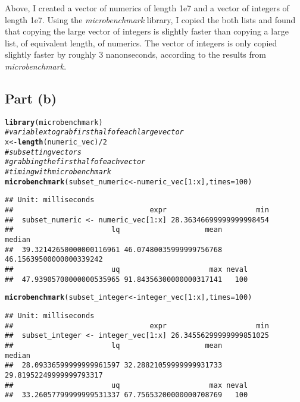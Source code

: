 \documentclass{article}\usepackage[]{graphicx}\usepackage[]{color}
\makeatletter
\newcommand{\hlnum}[1]{\textcolor[rgb]{0.686,0.059,0.569}{#1}}%
\newcommand{\hlcom}[1]{\textcolor[rgb]{0.678,0.584,0.686}{\textit{#1}}}%
\newcommand{\hlopt}[1]{\textcolor[rgb]{0,0,0}{#1}}%
\newcommand{\hlstd}[1]{\textcolor[rgb]{0.345,0.345,0.345}{#1}}%
\newcommand{\hlkwb}[1]{\textcolor[rgb]{0.69,0.353,0.396}{#1}}%
\newcommand{\hlkwc}[1]{\textcolor[rgb]{0.333,0.667,0.333}{#1}}%
\newcommand{\hlkwd}[1]{\textcolor[rgb]{0.737,0.353,0.396}{\textbf{#1}}}%
\newenvironment{kframe}{%
 \def\at@end@of@kframe{}%
 \ifinner\ifhmode%
  \def\at@end@of@kframe{\end{minipage}}%
  \begin{minipage}{\columnwidth}%
 \fi\fi%
 \def\FrameCommand##1{\hskip\@totalleftmargin \hskip-\fboxsep
 \colorbox{shadecolor}{##1}\hskip-\fboxsep
     \hskip-\linewidth \hskip-\@totalleftmargin \hskip\columnwidth}%
 \MakeFramed {\advance\hsize-\width
   \@totalleftmargin\z@ \linewidth\hsize
   \@setminipage}}%
 {\par\unskip\endMakeFramed%
 \at@end@of@kframe}
\newenvironment{knitrout}{}{} %
\makeatother
\begin{document}
Above, I created a vector of numerics of length 1e7 and a vector of integers of length 1e7.  Using the \emph{microbenchmark} library, I copied the both lists and found that copying the large vector of integers is slightly faster than copying a large list, of equivalent length, of numerics.  The vector of integers is only copied slightly faster by roughly 3 nanonseconds, according to the results from \emph{microbenchmark}.
\subsection{Part (b)}
\begin{knitrout}
\color{fgcolor}\begin{kframe}
\begin{alltt}
\hlkwd{library}\hlstd{(microbenchmark)}
\hlcom{#variable x to grab first half of each large vector}
\hlstd{x} \hlkwb{<-} \hlkwd{length}\hlstd{(numeric_vec)}\hlopt{/}\hlnum{2}
\hlcom{#subsetting vectors}
\hlcom{#grabbing the first half of each vector}
\hlcom{#timing with microbenchmark}
\hlkwd{microbenchmark}\hlstd{(subset_numeric} \hlkwb{<-} \hlstd{numeric_vec[}\hlnum{1}\hlopt{:}\hlstd{x],} \hlkwc{times} \hlstd{=} \hlnum{100}\hlstd{)}
\end{alltt}
\begin{verbatim}
## Unit: milliseconds
##                                expr                     min
##  subset_numeric <- numeric_vec[1:x] 28.36346699999999998454
##                       lq                    mean                  median
##  39.32142650000000116961 46.07480035999999756768 46.15639500000000339242
##                       uq                     max neval
##  47.93905700000000535965 91.84356300000000317141   100
\end{verbatim}
\begin{alltt}
\hlkwd{microbenchmark}\hlstd{(subset_integer} \hlkwb{<-} \hlstd{integer_vec[}\hlnum{1}\hlopt{:}\hlstd{x],} \hlkwc{times} \hlstd{=} \hlnum{100}\hlstd{)}
\end{alltt}
\begin{verbatim}
## Unit: milliseconds
##                                expr                     min
##  subset_integer <- integer_vec[1:x] 26.34556299999999851025
##                       lq                    mean                  median
##  28.09336599999999961597 32.28821059999999931733 29.81952249999999793317
##                       uq                     max neval
##  33.26057799999999531337 67.75653200000000708769   100
\end{verbatim}

\end{kframe}
\end{knitrout}
\end{document}
